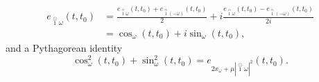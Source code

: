 \documentclass[reqno]{amsart}
\theoremstyle{plain}
\theoremstyle{definition}
\numberwithin{theorem}{section}
\numberwithin{definition}{section}
\numberwithin{prop}{section}
\numberwithin{example}{section}
\newcommand{\R}{\ensuremath{\mathbb{R}}}
\newcommand{\Z}{\ensuremath{\mathbb{Z}}}
\newcommand{\T}{\ensuremath{\mathbb{T}}}
\def\icirc{\overset{\odot}{\imath}}
\begin{document}
\begin{align}
e_{\icirc \omega}(t,t_0)&=  \frac{e_{\icirc \omega}(t,t_0) + e_{\icirc (-\omega)}(t,t_0)}{2} + i \frac{e_{\icirc \omega}(t,t_0) - e_{\icirc (-\omega)}(t,t_0)}{2i}\\
    &= \cos_{\omega}(t,t_0) + i \sin_{\omega}(t,t_0),
\end{align}
and a Pythagorean identity
\begin{equation}\cos_\omega^2(t,t_0)+\sin_\omega^2(t,t_0)=e_{2x_\omega+\mu |\icirc \omega|^2}(t,t_0).
\end{equation}
\end{document}
